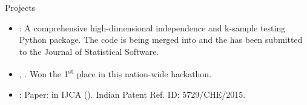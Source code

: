 \documentclass[]{mcdowellcv}
\begin{document}
	\begin{cvsection}{Projects}
		\begin{cvsubsection}{}{}{}
			\begin{itemize}
				\item \textbf{\href{https://github.com/neurodata/mgcpy}{}}: A comprehensive high-dimensional independence and k-sample testing Python package. The code is being merged into \href{https://github.com/scipy/scipy/pull/10524}{} and the \href{https://arxiv.org/abs/1907.02088}{} has been submitted to the Journal of Statistical Software.
				\item \textbf{\href{https://www.youtube.com/watch?v=iWw4_Ub2lPw&feature=youtu.be}{}}, \href{https://www.facebook.com/gtuoffice/videos/1786668221397028/?t=8798}{{}}. Won the 1\textsuperscript{st} place in this nation-wide hackathon.
				\item \textbf{\href{https://www.youtube.com/watch?v=O-L_uSHqQvQ}{}}: Paper: \href{http://research.ijcaonline.org/volume116/number11/pxc3902601.pdf}{} in IJCA (\href{https://www.researchgate.net/publication/275338025_Home_Automation_Systems_-_A_Study}{\color{blue!70}{cited 41 times}}). Indian Patent Ref. ID: 5729/CHE/2015.
			\end{itemize}
		\end{cvsubsection}
	\end{cvsection}
\end{document}
